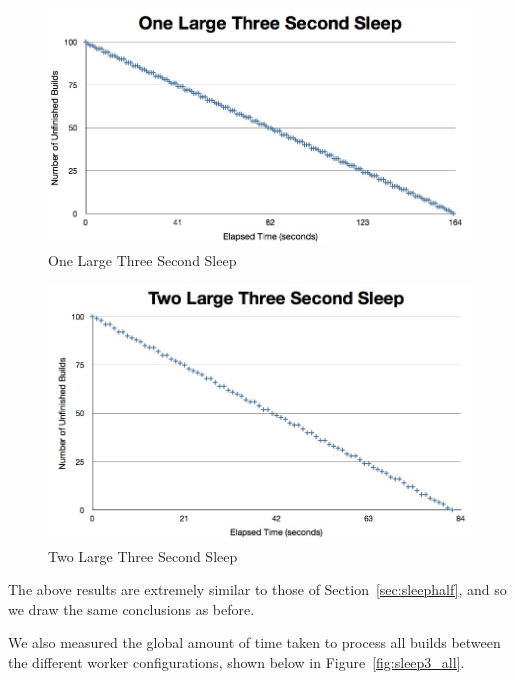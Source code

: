 \documentclass{scrartcl}
\begin{document}
\begin{figure}[h!]
  \begin{center}
    \includegraphics[scale=0.45]{raw_data/sleep3/one_large/graph.jpg}
  \end{center}
  \caption{One Large Three Second Sleep}
  \label{fig:sleep3_one_large_queuelength}
\end{figure}

\begin{figure}[h!]
  \begin{center}
    \includegraphics[scale=0.45]{raw_data/sleep3/two_large/graph.jpg}
  \end{center}
  \caption{Two Large Three Second Sleep}
  \label{fig:sleep3_two_large_queuelength}
\end{figure}

The above results are extremely similar to those of Section~\ref{sec:sleephalf}, and so we draw the same conclusions as before.

We also measured the global amount of time taken to process all builds between the different worker configurations, shown below in Figure~\ref{fig:sleep3_all}.
\end{document}
